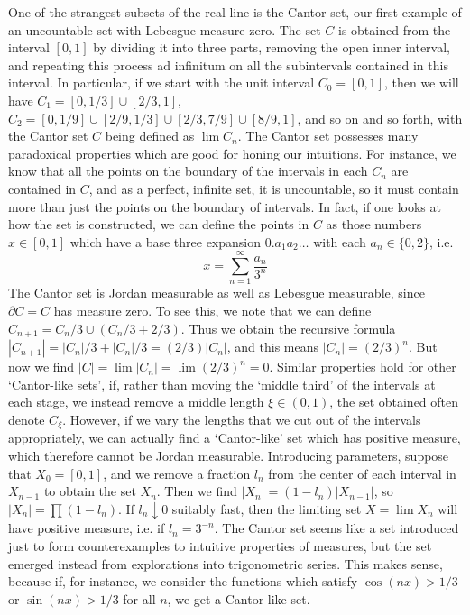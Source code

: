 One of the strangest subsets of the real line is the Cantor set, our first example of an uncountable set with Lebesgue measure zero. The set $C$ is obtained from the interval $[0,1]$ by dividing it into three parts, removing the open inner interval, and repeating this process ad infinitum on all the subintervals contained in this interval. In particular, if we start with the unit interval $C_0 = [0,1]$, then we will have $C_1 = [0,1/3] \cup [2/3,1]$, $C_2 = [0,1/9] \cup [2/9,1/3] \cup [2/3,7/9] \cup [8/9,1]$, and so on and so forth, with the Cantor set $C$ being defined as $\lim C_n$. The Cantor set possesses many paradoxical properties which are good for honing our intuitions. For instance, we know that all the points on the boundary of the intervals in each $C_n$ are contained in $C$, and as a perfect, infinite set, it is uncountable, so it must contain more than just the points on the boundary of intervals. In fact, if one looks at how the set is constructed, we can define the points in $C$ as those numbers $x \in [0,1]$ which have a base three expansion $0.a_1a_2 \dots$ with each $a_n \in \{ 0, 2 \}$, i.e.
%
\[ x = \sum_{n = 1}^\infty \frac{a_n}{3^n} \]
%
The Cantor set is Jordan measurable as well as Lebesgue measurable, since $\partial C = C$ has measure zero. To see this, we note that we can define $C_{n+1} = C_n/3 \cup (C_n/3 + 2/3)$. Thus we obtain the recursive formula $|C_{n+1}| = |C_n|/3 + |C_n|/3 = (2/3)|C_n|$, and this means $|C_n| = (2/3)^n$. But now we find $|C| = \lim |C_n| = \lim (2/3)^n = 0$. Similar properties hold for other `Cantor-like sets', if, rather than moving the `middle third' of the intervals at each stage, we instead remove a middle length $\xi \in (0,1)$, the set obtained often denote $C_\xi$. However, if we vary the lengths that we cut out of the intervals appropriately, we can actually find a `Cantor-like' set which has positive measure, which therefore cannot be Jordan measurable. Introducing parameters, suppose that $X_0 = [0,1]$, and we remove a fraction $l_n$ from the center of each interval in $X_{n-1}$ to obtain the set $X_n$. Then we find $|X_n| = (1 - l_n) |X_{n-1}|$, so $|X_n| = \prod (1 - l_n)$. If $l_n \downarrow 0$ suitably fast, then the limiting set $X = \lim X_n$ will have positive measure, i.e. if $l_n = 3^{-n}$. The Cantor set seems like a set introduced just to form counterexamples to intuitive properties of measures, but the set emerged instead from explorations into trigonometric series. This makes sense, because if, for instance, we consider the functions which satisfy $\cos(n x) > 1/3$ or $\sin(nx) > 1/3$ for all $n$, we get a Cantor like set.

